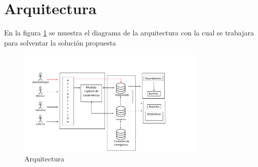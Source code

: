 \section{Arquitectura}

En la figura \ref{fig:arquitectura} se muestra el diagrama de la arquitectura con la cual se trabajara para solventar la solución propuesta


\begin{figure}[htb]
	\centering
	\includegraphics[width=0.8\textwidth]{images/cap2/Arquitectura}
	\caption{Arquitectura} \label{fig:arquitectura}
\end{figure}

